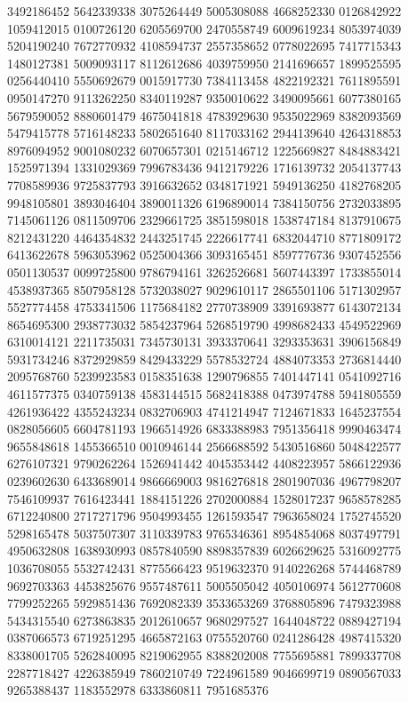 {{3492186452 5642339338 3075264449 5005308088 4668252330 0126842922 1059412015
0100726120 6205569700 2470558749 6009619234 8053974039 5204190240 7672770932
4108594737 2557358652 0778022695 7417715343 1480127381 5009093117 8112612686
4039759950 2141696657 1899525595 0256440410 5550692679 0015917730 7384113458
4822192321 7611895591 0950147270 9113262250 8340119287 9350010622 3490095661
6077380165 5679590052 8880601479 4675041818 4783929630 9535022969 8382093569
5479415778 5716148233 5802651640 8117033162 2944139640 4264318853 8976094952
9001080232 6070657301 0215146712 1225669827 8484883421 1525971394 1331029369
7996783436 9412179226 1716139732 2054137743 7708589936 9725837793 3916632652
0348171921 5949136250 4182768205 9948105801 3893046404 3890011326 6196890014
7384150756 2732033895 7145061126 0811509706 2329661725 3851598018 1538747184
8137910675 8212431220 4464354832 2443251745 2226617741 6832044710 8771809172
6413622678 5963053962 0525004366 3093165451 8597776736 9307452556 0501130537
0099725800 9786794161 3262526681 5607443397 1733855014 4538937365 8507958128
5732038027 9029610117 2865501106 5171302957 5527774458 4753341506 1175684182
2770738909 3391693877 6143072134 8654695300 2938773032 5854237964 5268519790
4998682433 4549522969 6310014121 2211735031 7345730131 3933370641 3293353631
3906156849 5931734246 8372929859 8429433229 5578532724 4884073353 2736814440
2095768760 5239923583 0158351638 1290796855 7401447141 0541092716 4611577375
0340759138 4583144515 5682418388 0473974788 5941805559 4261936422 4355243234
0832706903 4741214947 7124671833 1645237554 0828056605 6604781193 1966514926
6833388983 7951356418 9990463474 9655848618 1455366510 0010946144 2566688592
5430516860 5048422577 6276107321 9790262264 1526941442 4045353442 4408223957
5866122936 0239602630 6433689014 9866669003 9816276818 2801907036 4967798207
7546109937 7616423441 1884151226 2702000884 1528017237 9658578285 6712240800
2717271796 9504993455 1261593547 7963658024 1752745520 5298165478 5037507307
3110339783 9765346361 8954854068 8037497791 4950632808 1638930993 0857840590
8898357839 6026629625 5316092775 1036708055 5532742431 8775566423 9519632370
9140226268 5744468789 9692703363 4453825676 9557487611 5005505042 4050106974
5612770608 7799252265 5929851436 7692082339 3533653269 3768805896 7479323988
5434315540 6273863835 2012610657 9680297527 1644048722 0889427194 0387066573
6719251295 4665872163 0755520760 0241286428 4987415320 8338001705 5262840095
8219062955 8388202008 7755695881 7899337708 2287718427 4226385949 7860210749
7224961589 9046699719 0890567033 9265388437 1183552978 6333860811 7951685376
}}

